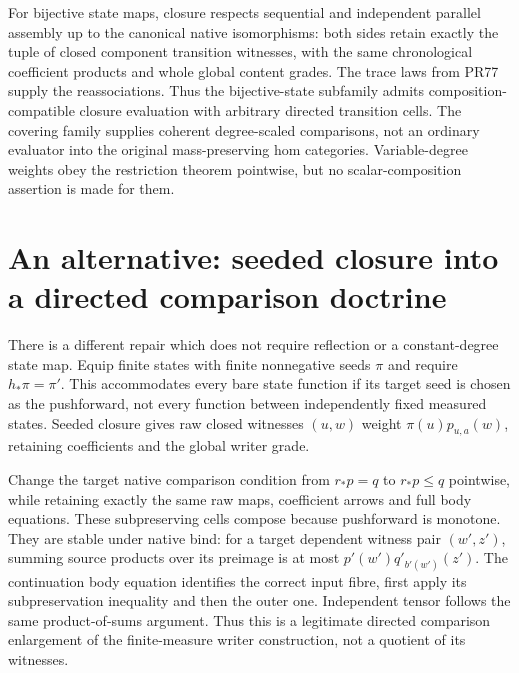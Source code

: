 \documentclass{article}
\begin{document}
For bijective state maps, closure respects sequential and independent parallel assembly up to the canonical native isomorphisms: both sides retain exactly the tuple of closed component transition witnesses, with the same chronological coefficient products and whole global content grades. The trace laws from PR77 supply the reassociations. Thus the bijective-state subfamily admits composition-compatible closure evaluation with arbitrary directed transition cells. The covering family supplies coherent degree-scaled comparisons, not an ordinary evaluator into the original mass-preserving hom categories. Variable-degree weights obey the restriction theorem pointwise, but no scalar-composition assertion is made for them.
\section{An alternative: seeded closure into a directed comparison doctrine}
There is a different repair which does not require reflection or a constant-degree state map. Equip finite states with finite nonnegative seeds $\pi$ and require $h_*\pi=\pi'$. This accommodates every bare state function if its target seed is chosen as the pushforward, not every function between independently fixed measured states. Seeded closure gives raw closed witnesses $(u,w)$ weight $\pi(u)p_{u,a}(w)$, retaining coefficients and the global writer grade.

Change the target native comparison condition from $r_*p=q$ to $r_*p\le q$ pointwise, while retaining exactly the same raw maps, coefficient arrows and full body equations. These subpreserving cells compose because pushforward is monotone. They are stable under native bind: for a target dependent witness pair $(w',z')$, summing source products over its preimage is at most $p'(w')q'_{b'(w')}(z')$. The continuation body equation identifies the correct input fibre, first apply its subpreservation inequality and then the outer one. Independent tensor follows the same product-of-sums argument. Thus this is a legitimate directed comparison enlargement of the finite-measure writer construction, not a quotient of its witnesses.
\end{document}
